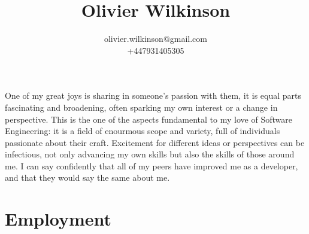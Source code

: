 \documentclass[a4paper,12pt]{article}
\title{\bfseries\Huge Olivier Wilkinson}
\author{olivier.wilkinson@gmail.com\\+447931405305}
\date{} %
\begin{document}
\maketitle

One of my great joys is sharing in someone's passion with them, it is equal
parts fascinating and broadening, often sparking my own interest or a change in
perspective. This is the one of the aspects fundamental to my love of Software
Engineering: it is a field of enourmous scope and variety, full of individuals
passionate about their craft. Excitement for different ideas or perspectives
can be infectious, not only advancing my own skills but also the skills of those
around me. I can say confidently that all of my peers have improved me as a
developer, and that they would say the same about me.

\section*{Employment}
\end{document}
